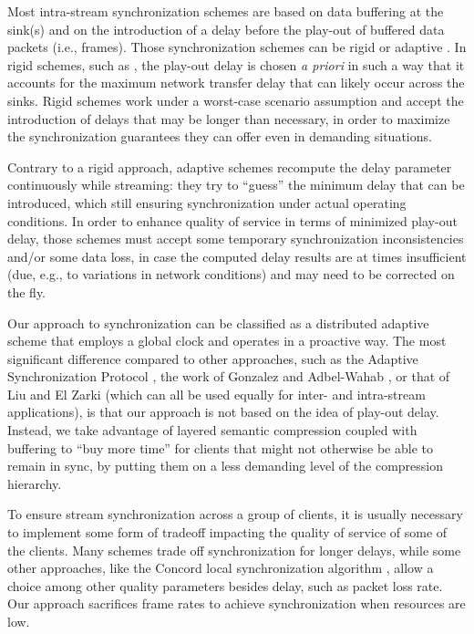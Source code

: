 \documentclass{sig-alternate}
\begin{document}
Most intra-stream synchronization schemes are based on data buffering
at the sink(s) and on the introduction of a delay before the play-out
of buffered data packets (i.e., frames).  Those synchronization
schemes can be rigid or adaptive \cite{Clark92}.  In rigid schemes,
such as \cite{Ferrari}, the play-out delay is chosen {\it a priori} in
such a way that it accounts for the maximum network transfer delay
that can likely occur across the sinks.  Rigid schemes work under a
worst-case scenario assumption and accept the introduction of delays
that may be longer than necessary, in order to maximize the
synchronization guarantees they can offer even in demanding
situations.

Contrary to a rigid approach, adaptive schemes
\cite{ASP,Lancaster,FSP} recompute the delay parameter continuously
while streaming: they try to ``guess'' the minimum delay that can be
introduced, which still ensuring synchronization under actual
operating conditions.  In order to enhance quality of service in terms
of minimized play-out delay, those schemes must accept some temporary
synchronization inconsistencies and/or some data loss, in case the
computed delay results are at times insufficient (due, e.g., to
variations in network conditions) and may need to be corrected on the
fly.

Our approach to synchronization can be classified as a distributed
adaptive scheme that employs a global clock and operates in a
proactive way.  The most significant difference compared to other
approaches, such as the Adaptive Synchronization Protocol \cite{ASP},
the work of Gonzalez and Adbel-Wahab \cite{GONZALEZ}, or that of Liu
and El Zarki\cite{LIU} (which can all be used equally for inter- and
intra-stream applications), is that our approach is not based on the
idea of play-out delay.  Instead, we take advantage of layered
semantic compression coupled with buffering to ``buy more time'' for
clients that might not otherwise be able to remain in sync, by putting
them on a less demanding level of the compression hierarchy.

To ensure stream synchronization across a group of clients, it is
usually necessary to implement some form of tradeoff impacting the
quality of service of some of the clients.  Many schemes trade off
synchronization for longer delays, while some other approaches, like
the Concord local synchronization algorithm \cite{Concord}, allow a
choice among other quality parameters besides delay, such as packet
loss rate.  Our approach sacrifices frame rates to achieve
synchronization when resources are low.
\end{document}

